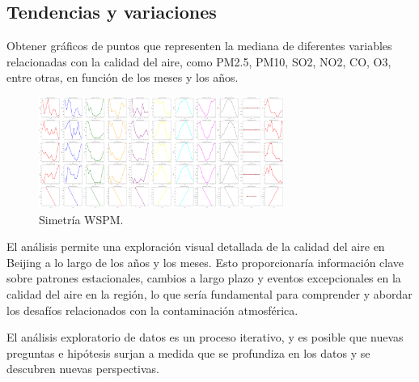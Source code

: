 \subsection{Tendencias y variaciones}
Obtener gráficos de puntos que representen la mediana de diferentes variables relacionadas con la calidad del aire, como PM2.5, PM10, SO2, NO2, CO, O3, entre otras, en función de los meses y los años.

\begin{figure}[htb] 
    \begin{center} 
        \includegraphics[width=8cm]{Papper IB/Images/expands_all_years.png}
    \end{center} 
    \caption{Simetría WSPM.} 
    \label{fig:fig1} 
\end{figure} 

El análisis permite una exploración visual detallada de la calidad del aire en Beijing a lo largo de los años y los meses. Esto proporcionaría información clave sobre patrones estacionales, cambios a largo plazo y eventos excepcionales en la calidad del aire en la región, lo que sería fundamental para comprender y abordar los desafíos relacionados con la contaminación atmosférica.\cite{liu2018spatio}

El análisis exploratorio de datos es un proceso iterativo, y es posible que nuevas preguntas e hipótesis surjan a medida que se profundiza en los datos y se descubren nuevas perspectivas.